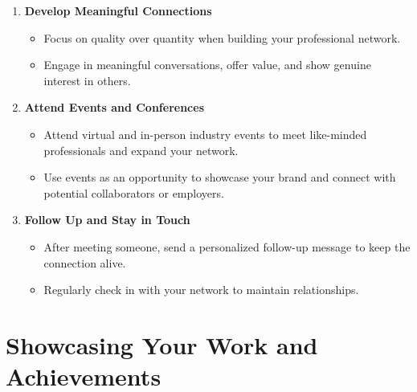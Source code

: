 \documentclass[
  letterpaper,
  DIV=11,
  numbers=noendperiod]{scrreprt}
\providecommand{\tightlist}{%
  \setlength{\itemsep}{0pt}\setlength{\parskip}{0pt}}\usepackage{longtable,booktabs,array}
\begin{document}
\begin{enumerate}
\def\labelenumi{\arabic{enumi}.}
\item
  \textbf{Develop Meaningful Connections}

  \begin{itemize}
  \tightlist
  \item
    Focus on quality over quantity when building your professional
    network.
  \item
    Engage in meaningful conversations, offer value, and show genuine
    interest in others.
  \end{itemize}
\item
  \textbf{Attend Events and Conferences}

  \begin{itemize}
  \tightlist
  \item
    Attend virtual and in-person industry events to meet like-minded
    professionals and expand your network.
  \item
    Use events as an opportunity to showcase your brand and connect with
    potential collaborators or employers.
  \end{itemize}
\item
  \textbf{Follow Up and Stay in Touch}

  \begin{itemize}
  \tightlist
  \item
    After meeting someone, send a personalized follow-up message to keep
    the connection alive.
  \item
    Regularly check in with your network to maintain relationships.
  \end{itemize}
\end{enumerate}

\section{Showcasing Your Work and
Achievements}\label{showcasing-your-work-and-achievements}
\end{document}

